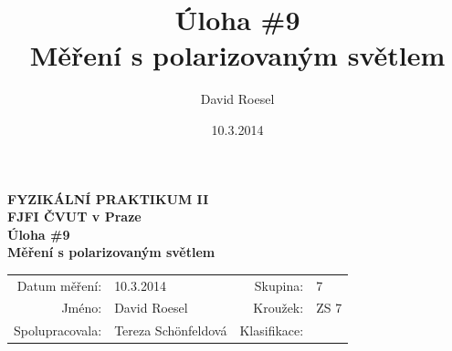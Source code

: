 \documentclass[english]{article}
\newcommand{\Author}{David Roesel}
\newcommand{\Coauthor}{Tereza Schönfeldová}
\newcommand{\Institute}{FJFI ČVUT v Praze}
\newcommand{\Subject}{FYZIKÁLNÍ PRAKTIKUM II}
\newcommand{\Group}{7}
\newcommand{\Circle}{ZS 7}
\newcommand{\Title}{Úloha \#9  \\Měření s polarizovaným světlem}
\newcommand{\Date}{10.3.2014}
\begin{document}
\author{\Author}
\title{\Title}
\date{\Date}

\renewcommand{\figurename}{Obr.}
\renewcommand{\tablename}{Tab.}
\renewcommand{\refname}{Reference}


\setlength{\parindent}{0cm}
\begin{multicols}{2}
\textbf{\Subject \\
        \Institute \\[0.1cm]
\Title \\[0.5cm]
}
\begin{tabular}{rlrl}
\large Datum měření: & \Date & \large Skupina: & \Group \\
\large Jméno: & \Author & \large Kroužek:  & \Circle\\
\large Spolupracovala: & \Coauthor &\large Klasifikace:\\
\end{tabular}


\end{multicols}
\end{document}
